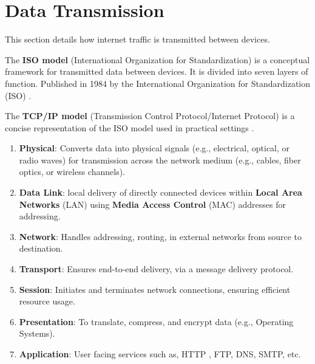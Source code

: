 \section{Data Transmission}
This section details how internet traffic is transmitted between devices.
\begin{Def}

    The \textbf{ISO model} (International Organization for Standardization) is a conceptual framework for transmitted data between devices. 
    It is divided into seven layers of function\cite{ibm_osi_model}. Published in 1984 by the International Organization for Standardization (ISO) \cite{kanade_osi_model}.

\end{Def}
\begin{Def}

    The \textbf{TCP/IP model} (Transmission Control Protocol/Internet Protocol)
    is a concise representation of the ISO model used in practical settings \cite{yasar_tcpip}.
\end{Def}

\newpage


\begin{Def}

    \begin{enumerate}
        \item \textbf{Physical}: Converts data into physical signals (e.g., electrical, optical, or radio waves) for transmission across the network medium (e.g., cables, fiber optics, or wireless channels).
        \item \textbf{Data Link}: local delivery of directly connected devices within \textbf{Local Area Networks} (LAN) using \textbf{Media Access Control} (MAC) addresses for 
        addressing.
        \item \textbf{Network}: Handles addressing, routing, in external networks from source to destination.
        \item \textbf{Transport}: Ensures end-to-end delivery, via a message delivery protocol.
        \item \textbf{Session}: Initiates and terminates network connections, ensuring efficient resource usage.
        \item \textbf{Presentation}: To translate, compress, and encrypt data  (e.g., Operating Systems).
        \item \textbf{Application}: User facing services such as, HTTP , FTP, DNS, SMTP, etc.
    \end{enumerate}
    \hfill \cite{leonard_osi_model}\cite{Rayes2022}
\end{Def}

